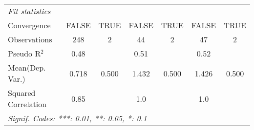 \begin{tabular}{lcccccc}
   \midrule
   \emph{Fit statistics}\\
   Convergence                                                &FALSE          & TRUE & FALSE        & TRUE & FALSE         & TRUE\\  
   Observations                                               & 248           & 2    & 44           & 2    & 47            & 2\\  
   Pseudo R$^2$                                               & 0.48          &      & 0.51         &      & 0.52          & \\  
Mean(Dep. Var.) & 0.718 & 0.500 & 1.432 & 0.500 & 1.426 & 0.500 \\
   Squared Correlation                                        & 0.85          &      & 1.0          &      & 1.0           & \\  
   \midrule \midrule
   \multicolumn{7}{l}{\emph{Signif. Codes: ***: 0.01, **: 0.05, *: 0.1}}\\
\end{tabular}
\par\endgroup
